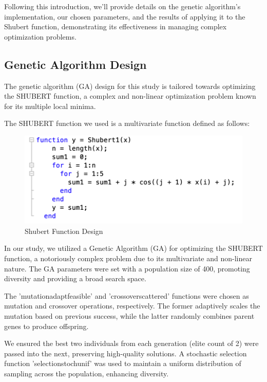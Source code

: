 \documentclass[conference]{inc/IEEEtran}
\begin{document}
Following this introduction, we'll provide details on the genetic algorithm's implementation, our chosen parameters, and the results of applying it to the
Shubert function, demonstrating its effectiveness in managing complex optimization problems.

\subsection{Genetic Algorithm Design}

The genetic algorithm (GA) design for this study is tailored towards optimizing the SHUBERT function, a complex and non-linear optimization problem known for its multiple local minima.

The SHUBERT function we used is a multivariate function defined as follows:

\begin{figure}
    \includegraphics[width=\linewidth]{figures/shubertdes.png}
    \caption{Shubert Function Design}
    \label{fig:boat1}
  \end{figure}

In our study, we utilized a Genetic Algorithm (GA) for optimizing the SHUBERT function, a notoriously complex problem due to its multivariate and non-linear nature. The GA parameters were set with a population size of 400, promoting diversity and providing a broad search space.

The 'mutationadaptfeasible' and 'crossoverscattered' functions were chosen as mutation and crossover operations, respectively. The former adaptively scales the mutation based on previous success, while the latter randomly combines parent genes to produce offspring. 

We ensured the best two individuals from each generation (elite count of 2) were passed into the next, preserving high-quality solutions. A stochastic selection function 'selectionstochunif' was used to maintain a uniform distribution of sampling across the population, enhancing diversity.
\end{document}
